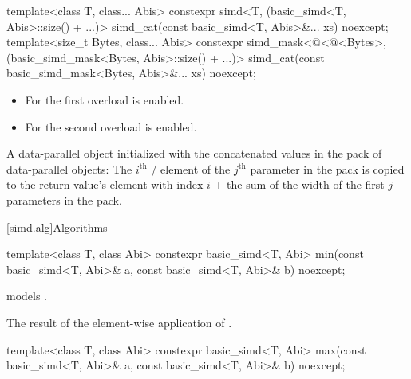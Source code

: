 \begin{itemdecl}
template<class T, class... Abis>
  constexpr simd<T, (basic_simd<T, Abis>::size() + ...)>
    simd_cat(const basic_simd<T, Abis>&... xs) noexcept;
template<size_t Bytes, class... Abis>
  constexpr simd_mask<@\deducet@<@\integerfrom@<Bytes>, (basic_simd_mask<Bytes, Abis>::size() + ...)>
    simd_cat(const basic_simd_mask<Bytes, Abis>&... xs) noexcept;

\end{itemdecl}

\begin{itemdescr}
  \pnum\constraints
  \begin{itemize}
    \item For the first overload  is enabled.

    \item For the second overload  is enabled.
  \end{itemize}

  \pnum\returns
  A data-parallel object initialized with the concatenated values in the  pack of
  data-parallel objects: The $i^\text{th}$ / element of the
  $j^\text{th}$ parameter in the  pack is copied to the return value's element with index
  $i$ + the sum of the width of the first $j$ parameters in the  pack.
\end{itemdescr}

[simd.alg]{Algorithms}

\begin{itemdecl}
template<class T, class Abi>
  constexpr basic_simd<T, Abi> min(const basic_simd<T, Abi>& a,
                                   const basic_simd<T, Abi>& b) noexcept;
\end{itemdecl}

\begin{itemdescr}
  \pnum\constraints
   models .

  \pnum\returns
  The result of the element-wise application of  .
\end{itemdescr}

\begin{itemdecl}
template<class T, class Abi>
  constexpr basic_simd<T, Abi> max(const basic_simd<T, Abi>& a,
                                   const basic_simd<T, Abi>& b) noexcept;
\end{itemdecl}

